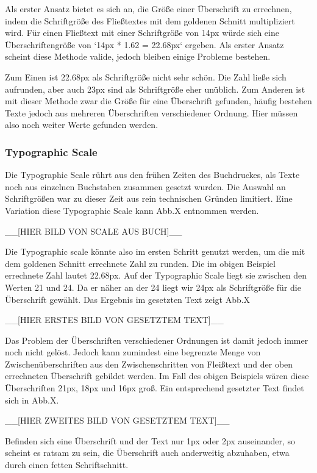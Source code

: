 Als erster Ansatz bietet es sich an, die Größe einer Überschrift zu errechnen, indem die Schriftgröße des Fließtextes mit dem goldenen Schnitt multipliziert wird.
Für einen Fließtext mit einer Schriftgröße von 14px würde sich eine Überschriftengröße von `14px * 1.62 = 22.68px` ergeben.
Als erster Ansatz scheint diese Methode valide, jedoch bleiben einige Probleme bestehen.

Zum Einen ist 22.68px als Schriftgröße nicht sehr schön. Die Zahl ließe sich aufrunden, aber auch 23px sind als Schriftgröße eher unüblich.
Zum Anderen ist mit dieser Methode zwar die Größe für eine Überschrift gefunden, häufig bestehen Texte jedoch aus mehreren Überschriften verschiedener Ordnung. Hier müssen also noch weiter Werte gefunden werden.

\subsubsection{Typographic Scale}
Die Typographic Scale rührt aus den frühen Zeiten des Buchdruckes, als Texte noch aus einzelnen Buchstaben zusammen gesetzt wurden. Die Auswahl an Schriftgrößen war zu dieser Zeit aus rein technischen Gründen limitiert. Eine Variation diese Typographic Scale kann Abb.X entnommen werden.

__[HIER BILD VON SCALE AUS BUCH]__

Die Typographic scale könnte also im ersten Schritt genutzt werden, um die mit dem goldenen Schnitt errechnete Zahl zu runden.
Die im obigen Beispiel errechnete Zahl lautet 22.68px. Auf der Typographic Scale liegt sie zwischen den Werten 21 und 24. Da er näher an der 24 liegt wir 24px als Schriftgröße für die Überschrift gewählt. Das Ergebnis im gesetzten Text zeigt Abb.X

__[HIER ERSTES BILD VON GESETZTEM TEXT]__

Das Problem der Überschriften verschiedener Ordnungen ist damit jedoch immer noch nicht gelöst. Jedoch kann zumindest eine begrenzte Menge von Zwischenüberschriften aus den Zwischenschritten von Fleißtext und der oben errechneten Überschrift gebildet werden. Im Fall des obigen Beispiels wären diese Überschriften 21px, 18px und 16px groß. Ein entsprechend gesetzter Text findet sich in Abb.X.

__[HIER ZWEITES BILD VON GESETZTEM TEXT]__

Befinden sich eine Überschrift und der Text nur 1px oder 2px auseinander, so scheint es ratsam zu sein, die Überschrift auch anderweitig abzuhaben, etwa durch einen fetten Schriftschnitt.

